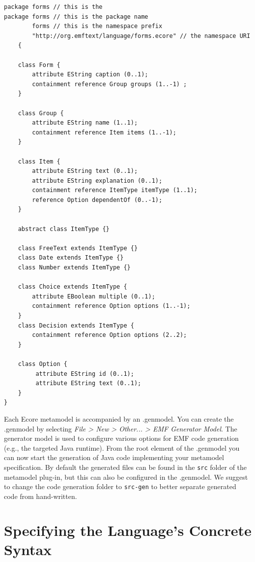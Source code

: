 	
	\lstset{language=textecore}
	\begin{lstlisting}[label=lst:formsMetamodel, caption=Metamodel for the
	exemplary forms language written in text.ecore] package forms // this is the
package forms // this is the package name 
        forms // this is the namespace prefix
        "http://org.emftext/language/forms.ecore" // the namespace URI 
	{

	class Form {
		attribute EString caption (0..1);
		containment reference Group groups (1..-1) ;
	}
	
	class Group {
		attribute EString name (1..1);
		containment reference Item items (1..-1);
	}

	class Item {
		attribute EString text (0..1);
		attribute EString explanation (0..1);
		containment reference ItemType itemType (1..1);
		reference Option dependentOf (0..-1);
	}

	abstract class ItemType {}

	class FreeText extends ItemType {}
	class Date extends ItemType {}	
	class Number extends ItemType {}

	class Choice extends ItemType {
		attribute EBoolean multiple (0..1);
		containment reference Option options (1..-1);
	}
	class Decision extends ItemType {
		containment reference Option options (2..2);
	}
		
	class Option {
		 attribute EString id (0..1);
		 attribute EString text (0..1);
	}
}

	\end{lstlisting}
	
Each Ecore metamodel is accompanied by an .genmodel. You can create the
	.genmodel by selecting \emph{File > New > Other... > EMF Generator Model}.
	The generator model is used to configure various options for EMF code
	generation (e.g., the targeted Java runtime). From the root element of
	the .genmodel you can now start the generation of Java code implementing your metamodel
	specification. By default the generated files can be found in the \texttt{src}
	folder of the metamodel plug-in, but this can also be configured in the
	.genmodel. We suggest to change the code generation folder to \texttt{src-gen}
	to better separate generated code from hand-written.

\section{Specifying the Language's Concrete Syntax}
\label{sec:process_specification}

